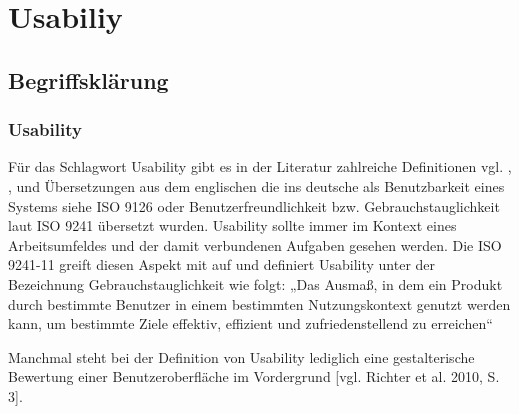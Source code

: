 \documentclass[a4paper, 12pt, twoside, BCOR=20mm, DIV=calc, abstracton, parskip=half*, toc=bibliography, toc=listof, headsepline, footsepline, headings=small, numbers=enddot]{scrreprt}
\begin{document}
	

\chapter{Usabiliy}
\section{Begriffsklärung}
	\subsection{Usability}
	Für das Schlagwort Usability gibt es in der Literatur zahlreiche Definitionen vgl. \cite[S.3]{balzert2009webdesign}, \cite[]{herczeg2005software}, \cite[S.9]{kerkau2009usability} und Übersetzungen aus dem englischen die ins deutsche als Benutzbarkeit eines Systems siehe ISO 9126 oder Benutzerfreundlichkeit bzw. Gebrauchstauglichkeit laut ISO 9241 übersetzt wurden.
	Usability sollte immer im Kontext eines Arbeitsumfeldes und der damit verbundenen Aufgaben gesehen werden. Die ISO 9241-11 greift diesen Aspekt mit auf und definiert Usability unter der Bezeichnung Gebrauchstauglichkeit wie folgt:
	„Das Ausmaß, in dem ein Produkt durch bestimmte Benutzer in einem bestimmten Nutzungskontext genutzt werden kann, um bestimmte Ziele effektiv, effizient und zufriedenstellend zu erreichen“\cite[S. 4]{ISO9241}
	
	Manchmal steht bei der Definition von Usability lediglich eine gestalterische
	Bewertung einer Benutzeroberfläche im Vordergrund [vgl. Richter et al. 2010,
	S. 3]. 
	
\end{document}
